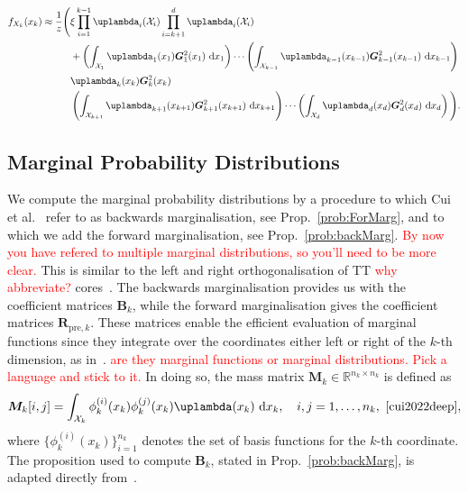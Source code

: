 \begin{align}
	\begin{split}
		f_{X_k}(x_k)  \approx \frac{1}{z} \Bigg(&\xi \prod_{i=1}^{k-1} \uplambda_i(\mathcal{X}_i) \prod_{i=k+1}^{d} \uplambda_i(\mathcal{X}_i) \\
		&+ \left( \int_{\mathcal{X}_1} \uplambda_1(x_1) \bm{G}_1^2(x_1)  \, \diff x_1 \right) \cdots 
		\left( \int_{\mathcal{X}_{k-1}} \uplambda_{k-1}(x_{k-1}) \bm{G}_{k-1}^2(x_{k-1}) \, \diff x_{k-1} \right) \\
		& \uplambda_k(x_k) \bm{G}_k^2(x_k)  \\
		&\left( \int_{\mathcal{X}_{k+1}} \uplambda_{k+1}(x_{k+1}) \bm{G}_{k+1}^2(x_{k+1})  \,\diff x_{k+1} \right) \cdots 
		\left( \int_{\mathcal{X}_d} \uplambda_d(x_d) \bm{G}_d^2(x_d)  \, \diff x_d \right) \Bigg).
	\end{split}
\end{align}




\subsection{Marginal Probability Distributions}
\label{subsec:TTMarg}
We compute the marginal probability distributions by a procedure to which Cui et al.~\cite{cui2022deep} refer to as backwards marginalisation, see Prop.~\ref{prob:ForMarg}, and to which we add the forward marginalisation, see Prop.~\ref{prob:backMarg}. \textcolor{red}{By now you have refered to multiple marginal distributions, so you'll need to be more clear.}
This is similar to the left and right orthogonalisation of TT \textcolor{red}{why abbreviate?} cores~\cite{oseledets2011tensor, Oseledets2011DMRG}.
The backwards marginalisation provides us with the coefficient matrices $\bm{B}_k$, while the forward marginalisation gives the coefficient matrices $\bm{R}_{\text{pre}, k}$. 
These matrices enable the efficient evaluation of marginal functions since they integrate over the coordinates either left or right of the $k$-th dimension, as in~\cite{cui2022deep}. \textcolor{red}{are they marginal functions or marginal distributions. Pick a language and stick to it.}
In doing so, the mass matrix $\bm{M}_k \in \mathbb{R}^{n_k \times n_k}$ is defined as
\begin{equation}
	\bm{M}_k[i, j] = \int_{\mathcal{X}_k} \phi^{(i)}_k(x_k) \phi^{(j)}_k(x_k) \uplambda(x_k) \, \diff x_k, \quad i, j = 1, \dots, n_k, \, \,  \text{\cite[Eq. 22]{cui2022deep}} \label{eq:MassMat},
\end{equation}
where $\{\phi^{(i)}_k(x_k)\}_{i=1}^{n_k}$ denotes the set of basis functions for the $k$-th coordinate.
The proposition used to compute $\bm{B}_k$, stated in Prop.~\ref{prob:backMarg}, is adapted directly from~\cite{cui2022deep}.

